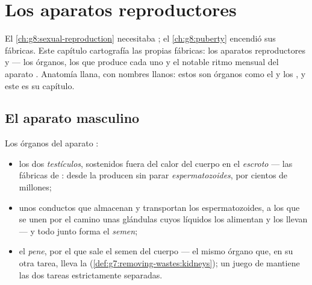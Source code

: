 \chapter{Los aparatos reproductores}\label{ch:g8:reproductive-systems}

El \cref{ch:g8:sexual-reproduction} necesitaba ; el
\cref{ch:g8:puberty} encendió sus fábricas. Este capítulo cartografía
las propias fábricas: los aparatos reproductores  y 
--- los órganos, los  que produce cada uno y el notable ritmo
mensual del aparato . Anatomía llana, con nombres llanos: estos
son órganos como el  y los , y este es su capítulo.

\section{El aparato masculino}

\begin{definition}\label{def:g8:reproductive-systems:male}
Los órganos del aparato :
\begin{itemize}
  \item los dos \emph{testículos}, sostenidos fuera
        del calor del cuerpo en el \emph{escroto} --- las fábricas de
        : desde la  producen sin parar
        \emph{espermatozoides}, por cientos de
        millones;
  \item unos conductos que almacenan y transportan los
        espermatozoides, a los que se unen por el camino unas glándulas
        cuyos líquidos los alimentan y los llevan --- y todo junto forma
        el \emph{semen};
  \item el \emph{pene}, por el que sale el semen del cuerpo
        --- el mismo órgano que, en su otra tarea, lleva la 
        (\cref{def:g7:removing-wastes:kidneys}); un juego de 
        mantiene las dos tareas estrictamente separadas.
\end{itemize}
\end{definition}


